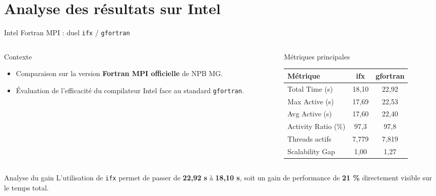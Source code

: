 \section[Analyse Intel]{Analyse des résultats sur Intel}

\begin{frame}{Intel Fortran MPI : duel \texttt{ifx} / \texttt{gfortran}}
\small

\begin{columns}[T,onlytextwidth]
    \begin{column}{0.44\textwidth}
        \begin{block}{Contexte}
            \begin{itemize}\setlength{\itemsep}{1em}
                \item Comparaison sur la version \textbf{Fortran MPI officielle} de NPB MG.
                \item Évaluation de l'efficacité du compilateur Intel face au standard \texttt{gfortran}.
            \end{itemize}
        \end{block}
    \end{column}
    \hfill 
    \begin{column}{0.52\textwidth}
        \begin{block}{Métriques principales}
            \centering
            \renewcommand{\arraystretch}{1.1}
            \footnotesize
            \begin{tabular}{|l|c|c|}
                \hline
                \textbf{Métrique} & \textbf{ifx} & \textbf{gfortran} \\ \hline
                Total Time (s)      & 18,10 & 22,92 \\ \hline
                Max Active (s)      & 17,69 & 22,53 \\ \hline
                Avg Active (s)      & 17,60 & 22,40 \\ \hline
                Activity Ratio (\%) & 97,3  & 97,8  \\ \hline
                Threads actifs      & 7,779 & 7,819 \\ \hline
                Scalability Gap     & 1,00  & 1,27  \\ \hline
            \end{tabular}
        \end{block}
    \end{column}
\end{columns}
\vfill 
\begin{exampleblock}{Analyse du gain}
    \centering
    \small
    L'utilisation de \texttt{ifx} permet de passer de \textbf{22,92 s} à \textbf{18,10 s}, soit un gain de performance de \textbf{21 \%} directement visible sur le temps total.
\end{exampleblock}

\end{frame}

